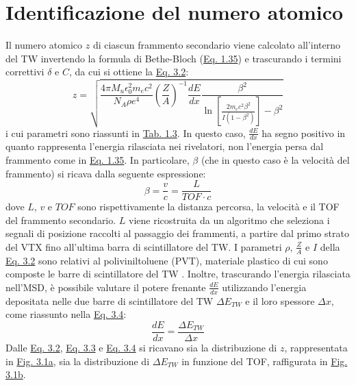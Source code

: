 \documentclass[12pt,a4paper,twoside]{report}
\begin{document}
	\section{Identificazione del numero atomico}\label{sec:atomic_number_identification}
	Il numero atomico $z$ di ciascun frammento secondario viene calcolato all'interno del TW invertendo la formula di Bethe-Bloch (\hyperref[eq:bethe_bloch]{Eq. 1.35}) e trascurando i termini correttivi $\delta$ e $C$, da cui si ottiene la \hyperref[eq:atomic_number]{Eq. 3.2}:
	\begin{equation}
		z=\sqrt{\frac{4\pi M_u\epsilon_0^2m_ec^2}{N_A\rho e^4}\left(\frac{Z}{A}\right)^{-1}\frac{dE}{dx}\frac{\beta^2}{\ln{\left[\frac{2m_ec^2\beta^2}{I\left(1-\beta^2\right)}\right]}-\beta^2}}
		\label{eq:atomic_number}
	\end{equation}
	i cui parametri sono riassunti in \hyperref[tab:bethe_bloch]{Tab. 1.3}. In questo caso, $\frac{dE}{dx}$ ha segno positivo in quanto rappresenta l'energia rilasciata nei rivelatori, non l'energia persa dal frammento come in \hyperref[eq:bethe_bloch]{Eq. 1.35}. In particolare, $\beta$ (che in questo caso è la velocità del frammento) si ricava dalla seguente espressione:
	\begin{equation}
		\beta=\frac{v}{c}=\frac{L}{TOF\cdot c}
		\label{eq:beta_beam}
	\end{equation}
	dove $L$, $v$ e $TOF$ sono rispettivamente la distanza percorsa, la velocità e il TOF del frammento secondario. $L$ viene ricostruita da un algoritmo che seleziona i segnali di posizione raccolti al passaggio dei frammenti, a partire dal primo strato del VTX fino all'ultima barra di scintillatore del TW. I parametri $\rho$, $\frac{Z}{A}$ e $I$ della \hyperref[eq:atomic_number]{Eq. 3.2} sono relativi al poliviniltoluene (PVT), materiale plastico di cui sono composte le barre di scintillatore del TW \cite{pvt}. Inoltre, trascurando l'energia rilasciata nell'MSD, è possibile valutare il potere frenante $\frac{dE}{dx}$ utilizzando l'energia depositata nelle due barre di scintillatore del TW $\Delta E_{TW}$ e il loro spessore $\Delta x$, come riassunto nella \hyperref[eq:stopping_power]{Eq. 3.4}:
	\begin{equation}
		\frac{dE}{dx}=\frac{\Delta E_{TW}}{\Delta x}
		\label{eq:stopping_power}
	\end{equation}
	Dalle \hyperref[eq:atomic_number]{Eq. 3.2}, \hyperref[eq:beta_beam]{Eq. 3.3} e \hyperref[eq:stopping_power]{Eq. 3.4} si ricavano sia la distribuzione di $z$, rappresentata in \hyperref[fig:atomic_numbersa]{Fig. 3.1a}, sia la distribuzione di $\Delta E_{TW}$ in funzione del TOF, raffigurata in \hyperref[fig:atomic_numbersb]{Fig. 3.1b}.
	
\end{document}

